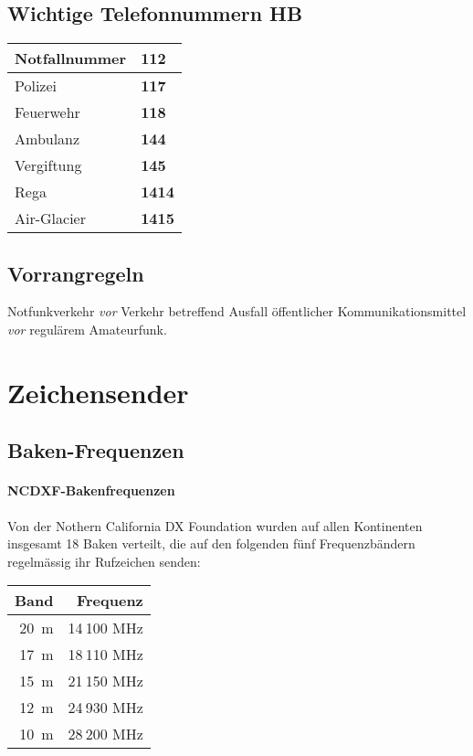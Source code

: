 \subsection{Wichtige Telefonnummern HB}
\begin{tabular}{l  >{\bfseries} l}
Notfallnummer & 112 \\ \midrule
Polizei & 117 \\ \midrule
Feuerwehr & 118 \\ \midrule
Ambulanz & 144 \\ \midrule
Vergiftung & 145 \\ \midrule
Rega & 1414 \\ \midrule
Air-Glacier & 1415 \\ \midrule
\end{tabular}

\subsection{Vorrangregeln}
Notfunkverkehr \textit{vor} Verkehr betreffend Ausfall öffentlicher Kommunikationsmittel \textit{vor} regulärem Amateurfunk.



\section{Zeichensender}
\subsection{Baken-Frequenzen}
\paragraph{NCDXF-Bakenfrequenzen} \label{sec:ncdxf} Von der Nothern California DX Foundation wurden auf allen Kontinenten insgesamt 18 Baken verteilt, die auf den folgenden fünf Frequenzbändern regelmässig ihr Rufzeichen senden:

\vspace{1em}
\begin{tabular}{r r}
\bfseries Band & \bfseries Frequenz \\ \toprule
20 m & 14 100 MHz \\ \midrule                                                                                                                                                                 
17 m & 18 110 MHz \\ \midrule                                                                                                                                                                 
15 m & 21 150 MHz \\ \midrule                                                                                                                                                                 
12 m & 24 930 MHz \\ \midrule                                                                                                                                                                 
10 m & 28 200 MHz \\ \midrule
\end{tabular}
\vspace{1em}

